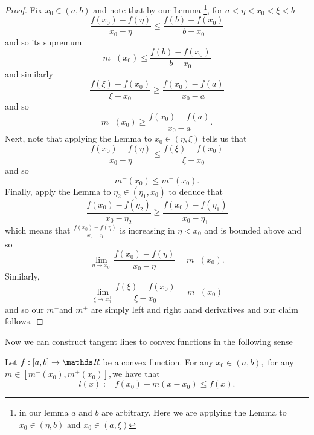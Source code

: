 \begin{proof}
Fix $x_{0}\in\left(a,b\right)$ and note that by our Lemma \footnote{in our lemma $a$ and $b$ are arbitrary. Here we are applying the
Lemma to $x_{0}\in\left(\eta,b\right)$ and $x_{0}\in\left(a,\xi\right)$}, for $a<\eta<x_{0}<\xi<b$
\[
\frac{f\left(x_{0}\right)-f\left(\eta\right)}{x_{0}-\eta}\leq\frac{f\left(b\right)-f\left(x_{0}\right)}{b-x_{0}}
\]
and so its supremum 
\[
m^{-}\left(x_{0}\right)\leq\frac{f\left(b\right)-f\left(x_{0}\right)}{b-x_{0}}
\]
and similarly 
\[
\frac{f\left(\xi\right)-f\left(x_{0}\right)}{\xi-x_{0}}\geq\frac{f\left(x_{0}\right)-f\left(a\right)}{x_{0}-a}
\]
and so 
\[
m^{+}\left(x_{0}\right)\geq\frac{f\left(x_{0}\right)-f\left(a\right)}{x_{0}-a}.
\]
Next, note that applying the Lemma to $x_{0}\in\left(\eta,\xi\right)$
tells us that 
\[
\frac{f\left(x_{0}\right)-f\left(\eta\right)}{x_{0}-\eta}\leq\frac{f\left(\xi\right)-f\left(x_{0}\right)}{\xi-x_{0}}
\]
and so
\[
m^{-}\left(x_{0}\right)\leq m^{+}\left(x_{0}\right).
\]
Finally, apply the Lemma to $\eta_{2}\in\left(\eta_{1},x_{0}\right)$
to deduce that 
\[
\frac{f\left(x_{0}\right)-f\left(\eta_{2}\right)}{x_{0}-\eta_{2}}\geq\frac{f\left(x_{0}\right)-f\left(\eta_{1}\right)}{x_{0}-\eta_{1}}
\]
which means that $\frac{f\left(x_{0}\right)-f\left(\eta\right)}{x_{0}-\eta}$
is increasing in $\eta<x_{0}$ and is bounded above and so
\[
\lim_{\eta\to x_{0}^{-}}\frac{f\left(x_{0}\right)-f\left(\eta\right)}{x_{0}-\eta}=m^{-}\left(x_{0}\right).
\]
Similarly, 
\[
\lim_{\xi\to x_{0}^{+}}\frac{f\left(\xi\right)-f\left(x_{0}\right)}{\xi-x_{0}}=m^{+}\left(x_{0}\right)
\]
and so our $m^{-}$and $m^{+}$ are simply left and right hand derivatives
and our claim follows.
\end{proof}
Now we can construct tangent lines to convex functions in the following
sense
\begin{prop}
\label{prop:subderivatives}Let $f:\left[a,b\right]\to\R$ be a convex
function. For any $x_{0}\in\left(a,b\right),$ for any $m\in\left[m^{-}\left(x_{0}\right),m^{+}\left(x_{0}\right)\right],$we
have that
\[
l\left(x\right):=f\left(x_{0}\right)+m\left(x-x_{0}\right)\leq f\left(x\right).
\]
\end{prop}

